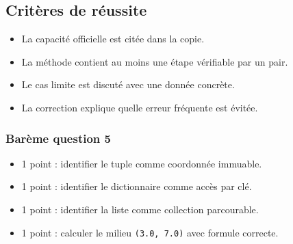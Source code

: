 \subsection{Critères de réussite}

\begin{itemize}
\tightlist
\item
  La capacité officielle est citée dans la copie.
\item
  La méthode contient au moins une étape vérifiable par un pair.
\item
  Le cas limite est discuté avec une donnée concrète.
\item
  La correction explique quelle erreur fréquente est évitée.
\end{itemize}

\subsubsection{Barème question 5}

\begin{itemize}
\tightlist
\item
  1 point : identifier le tuple comme coordonnée immuable.
\item
  1 point : identifier le dictionnaire comme accès par clé.
\item
  1 point : identifier la liste comme collection parcourable.
\item
  1 point : calculer le milieu \texttt{(3.0,\ 7.0)} avec formule
  correcte.
\end{itemize}
